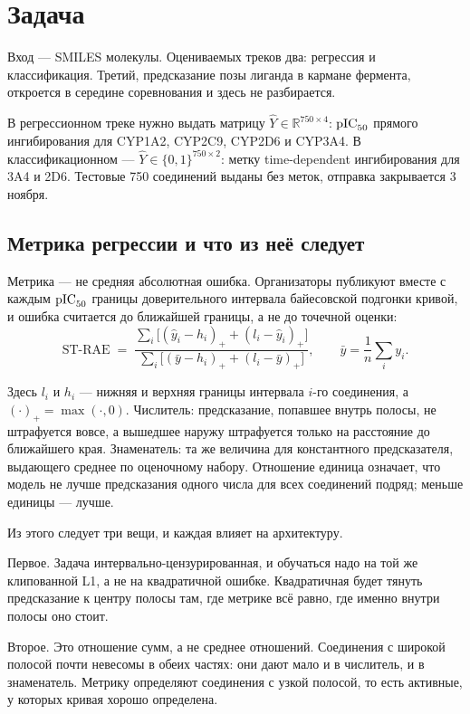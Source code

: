 \section{Задача}
\label{sec:task}

Вход --- SMILES молекулы. Оцениваемых треков два: регрессия и классификация. Третий, предсказание позы
лиганда в кармане фермента, откроется в середине соревнования и здесь не разбирается.

В регрессионном треке нужно выдать матрицу $\hat{Y} \in \mathbb{R}^{750\times 4}$: $\mathrm{pIC}_{50}$ прямого
ингибирования для CYP1A2, CYP2C9, CYP2D6 и CYP3A4. В классификационном --- $\hat{Y} \in \{0,1\}^{750\times 2}$:
метку time-dependent ингибирования для 3A4 и 2D6. Тестовые 750 соединений выданы без меток, отправка
закрывается 3 ноября.

\subsection{Метрика регрессии и что из неё следует}

Метрика --- не средняя абсолютная ошибка. Организаторы публикуют вместе с каждым $\mathrm{pIC}_{50}$ границы
доверительного интервала байесовской подгонки кривой, и ошибка считается до ближайшей границы, а не до
точечной оценки:
\begin{equation}
\text{ST-RAE} \;=\;
\frac{\sum_i \bigl[(\hat y_i - h_i)_+ + (l_i - \hat y_i)_+\bigr]}
     {\sum_i \bigl[(\bar y - h_i)_+ + (l_i - \bar y)_+\bigr]},
\qquad \bar y = \frac{1}{n}\sum_i y_i .
\label{eq:strae}
\end{equation}

Здесь $l_i$ и $h_i$ --- нижняя и верхняя границы интервала $i$-го соединения, а $(\cdot)_+ = \max(\cdot, 0)$.
Числитель: предсказание, попавшее внутрь полосы, не штрафуется вовсе, а вышедшее наружу штрафуется только
на расстояние до ближайшего края. Знаменатель: та же величина для константного предсказателя, выдающего
среднее по оценочному набору. Отношение единица означает, что модель не лучше предсказания одного числа для всех соединений подряд;
меньше единицы --- лучше.

Из этого следует три вещи, и каждая влияет на архитектуру.

Первое. Задача интервально-цензурированная, и обучаться надо на той же клипованной L1, а не на квадратичной
ошибке. Квадратичная будет тянуть предсказание к центру полосы там, где метрике всё равно, где именно
внутри полосы оно стоит.

Второе. Это отношение сумм, а не среднее отношений. Соединения с широкой полосой почти невесомы в обеих
частях: они дают мало и в числитель, и в знаменатель. Метрику определяют соединения с узкой полосой,
то есть активные, у которых кривая хорошо определена.


